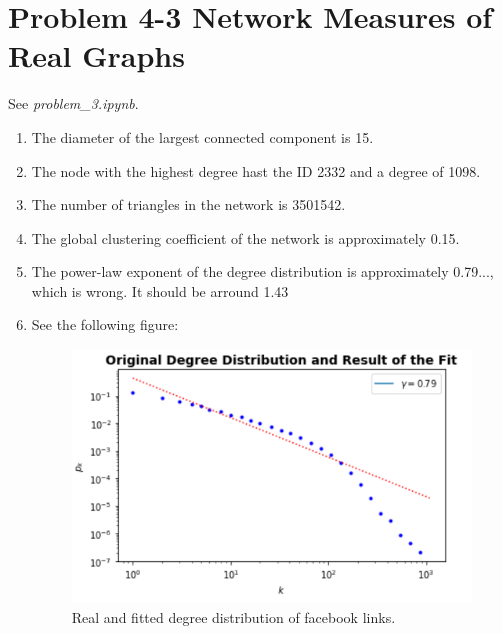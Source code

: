 \section{Problem 4-3 Network Measures of Real Graphs}
See \textit{problem\_3.ipynb}.

\begin{enumerate}
	\item The diameter of the largest connected component is 15.
	\item The node with the highest degree hast the ID 2332 and a degree of 1098.
	\item The number of triangles in the network is 3501542.
	\item The global clustering coefficient of the network is approximately 0.15.
	\item The power-law exponent of the degree distribution is approximately 0.79...,  which is wrong.  It should be arround 1.43
	\item See the following figure:
	
	\begin{figure}[h]
		\centering
		\includegraphics[width=0.9\linewidth]{images/problem43_degree_distribution.png}
		\caption{Real and fitted degree distribution of facebook links.}
		\label{distribution}
	\end{figure}
\end{enumerate}
